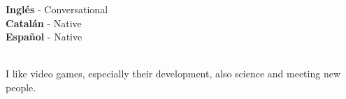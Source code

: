 \documentclass[9pt]{developercv} %
\begin{document}

\begin{minipage}[t]{0.3\textwidth}
	\vspace{-\baselineskip} %


	\textbf{Inglés} - Conversational\\
	\textbf{Catalán} - Native\\
	\textbf{Español} - Native
\end{minipage}
\hfill
\begin{minipage}[t]{0.3\textwidth}
	\vspace{-\baselineskip} %

	\\
	I like video games, especially their development, also science and meeting new people.

\end{minipage}
\hfill

\end{document}

